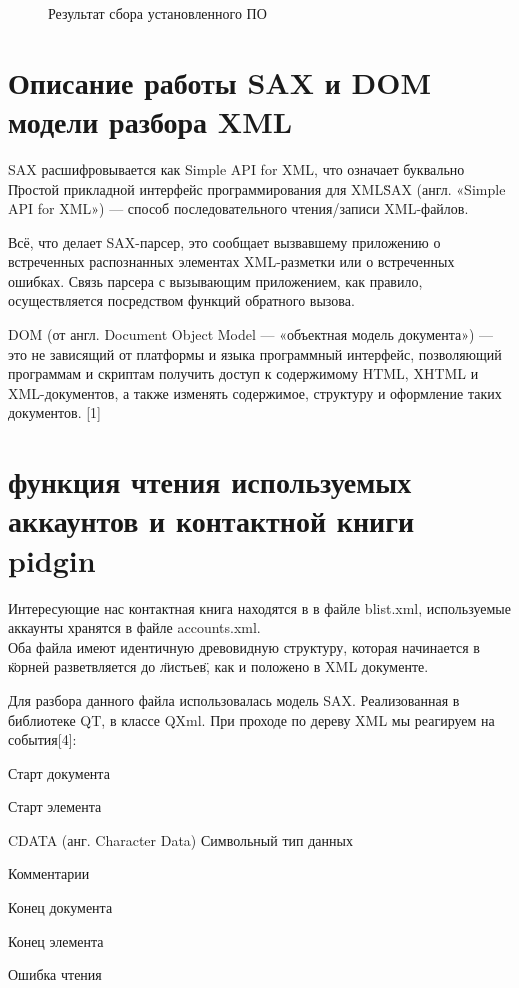 \begin{figure}[h]
\caption{Результат сбора установленного ПО}
\label{pic:xml_to_xslt7}
\end{figure}

\chapter*{Описание работы SAX и DOM модели разбора XML}

SAX расшифровывается как Simple API for XML, что означает буквально \"Простой прикладной интерфейс программирования для XML\"

SAX (англ. «Simple API for XML») — способ последовательного чтения/записи XML-файлов.

Всё, что делает SAX-парсер, это сообщает вызвавшему приложению о встреченных распознанных элементах XML-разметки или о встреченных ошибках. Связь парсера с вызывающим приложением, как правило, осуществляется посредством функций обратного вызова.

DOM (от англ. Document Object Model — «объектная модель документа») — это не зависящий от платформы и языка программный интерфейс, позволяющий программам и скриптам получить доступ к содержимому HTML, XHTML и XML-документов, а также изменять содержимое, структуру и оформление таких документов.
[1]%
\chapter*{функция чтения используемых аккаунтов и контактной книги pidgin}
Интересующие нас контактная книга находятся в %
в файле blist.xml, используемые аккаунты хранятся в файле accounts.xml.
\\Оба файла имеют идентичную древовидную структуру, которая начинается в \"корне\" и разветвляется до \"листьев\", как и положено в XML документе.

Для разбора данного файла использовалась модель SAX. Реализованная в библиотеке QT, в классе QXml. При проходе по дереву XML мы реагируем на события[4]:
\item Старт документа
\item Старт элемента
\item CDATA (анг. Character Data) Символьный тип данных
\item Комментарии
\item Конец документа
\item Конец элемента
\item Ошибка чтения

